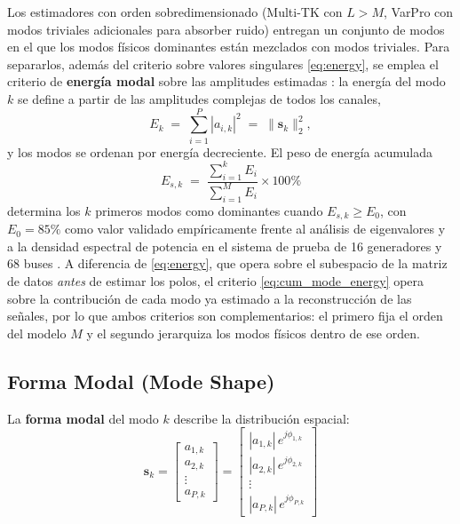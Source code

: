 Los estimadores con orden sobredimensionado (Multi-TK con $L>M$, VarPro
con modos triviales adicionales para absorber ruido) entregan un conjunto
de modos en el que los modos físicos dominantes están mezclados con modos
triviales. Para separarlos, además del criterio sobre valores singulares
\eqref{eq:energy}, se emplea el criterio de \textbf{energía modal} sobre
las amplitudes estimadas \cite{jiang2021}: la energía del modo $k$ se
define a partir de las amplitudes complejas de todos los canales,
\begin{equation}
    E_k \;=\; \sum_{i=1}^{P} |a_{i,k}|^2
    \;=\; \lVert \mathbf{s}_k \rVert_2^2,
    \label{eq:mode_energy}
\end{equation}
y los modos se ordenan por energía decreciente. El peso de energía
acumulada
\begin{equation}
    E_{s,k} \;=\;
    \frac{\displaystyle\sum_{i=1}^{k} E_i}{\displaystyle\sum_{i=1}^{M} E_i}
    \times 100\%
    \label{eq:cum_mode_energy}
\end{equation}
determina los $k$ primeros modos como dominantes cuando
$E_{s,k} \ge E_0$, con $E_0 = 85\%$ como valor validado empíricamente
frente al análisis de eigenvalores y a la densidad espectral de potencia
en el sistema de prueba de 16 generadores y 68 buses \cite{jiang2021}. A
diferencia de \eqref{eq:energy}, que opera sobre el subespacio de la
matriz de datos \emph{antes} de estimar los polos, el criterio
\eqref{eq:cum_mode_energy} opera sobre la contribución de cada modo ya
estimado a la reconstrucción de las señales, por lo que ambos criterios
son complementarios: el primero fija el orden del modelo $M$ y el segundo
jerarquiza los modos físicos dentro de ese orden.

\subsection{Forma Modal (Mode Shape)}

La \textbf{forma modal} del modo $k$ describe la distribución espacial:
\begin{equation}
\mathbf{s}_k =
\begin{bmatrix}
    a_{1,k} \\
    a_{2,k} \\
    \vdots \\
    a_{P,k}
\end{bmatrix}
=
\begin{bmatrix}
    |a_{1,k}|\,e^{j\phi_{1,k}} \\
    |a_{2,k}|\,e^{j\phi_{2,k}} \\
    \vdots \\
    |a_{P,k}|\,e^{j\phi_{P,k}}
\end{bmatrix}
\end{equation}

